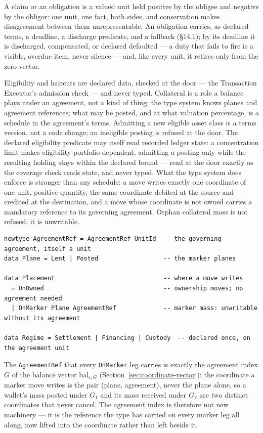 A claim or an obligation is a valued unit held positive by the obligee and
negative by the obligor: one unit, one fact, both sides, and conservation makes
disagreement between them unrepresentable. An obligation carries, as declared
terms, a deadline, a discharge predicate, and a fallback (\S14.1); by its
deadline it is discharged, compensated, or declared defaulted --- a duty that
fails to fire is a visible, overdue item, never silence --- and, like every
unit, it retires only from the zero vector.

Eligibility and haircuts are declared data, checked at the door --- the
Transaction Executor's admission check --- and never typed. Collateral is a
role a balance plays under an agreement, not a kind of thing: the type system
knows planes and agreement references; what may be posted, and at what
valuation percentage, is a schedule in the agreement's terms. Admitting a new
eligible asset class is a terms version, not a code change; an ineligible
posting is refused at the door. The declared eligibility predicate may itself read
recorded ledger state: a concentration limit makes eligibility portfolio-dependent,
admitting a posting only while the resulting holding stays within the declared bound
--- read at the door exactly as the coverage check reads state, and never typed. What
the type system does enforce is stronger
than any schedule: a move writes exactly one coordinate of one unit, positive
quantity, the same coordinate debited at the source and credited at the
destination, and a move whose coordinate is not owned carries a mandatory
reference to its governing agreement. Orphan collateral mass is not refused;
it is unwritable.

\begin{lstlisting}
newtype AgreementRef = AgreementRef UnitId  -- the governing agreement, itself a unit
data Plane = Lent | Posted                  -- the marker planes

data Placement                              -- where a move writes
  = OnOwned                                 -- ownership moves; no agreement needed
  | OnMarker Plane AgreementRef             -- marker mass: unwritable without its agreement

data Regime = Settlement | Financing | Custody  -- declared once, on the agreement unit
\end{lstlisting}

The \texttt{AgreementRef} that every \texttt{OnMarker} leg carries is exactly the
agreement index $G$ of the balance vector $\mathrm{bal}_{c,G}$
(Section~\ref{sec:coordinate-vector}): the coordinate a marker move writes is the
pair (plane, agreement), never the plane alone, so a wallet's mass posted under $G_1$ and
its mass received under $G_2$ are two distinct coordinates that never cancel. The agreement
index is therefore not new machinery --- it is the reference the type has carried on every
marker leg all along, now lifted into the coordinate rather than left beside it.

